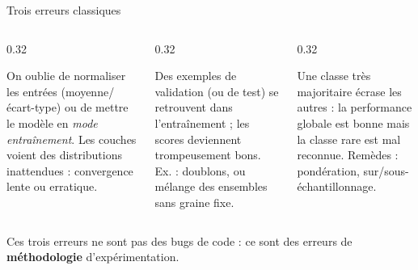 \begin{frame}{Trois erreurs classiques}
\begin{columns}[t]
\begin{column}{0.32\textwidth}
\begin{wbox}
On oublie de normaliser les entrées (moyenne/écart-type) ou de mettre le modèle
en \emph{mode entraînement}. Les couches voient des distributions inattendues :
convergence lente ou erratique.
\end{wbox}
\end{column}
\begin{column}{0.32\textwidth}
\begin{wbox}
Des exemples de validation (ou de test) se retrouvent dans l'entraînement ; les
scores deviennent trompeusement bons. Ex. : doublons, ou mélange des ensembles
sans graine fixe.
\end{wbox}
\end{column}
\begin{column}{0.32\textwidth}
\begin{wbox}
Une classe très majoritaire écrase les autres : la performance globale est
bonne mais la classe rare est mal reconnue. Remèdes : pondération, sur/sous-échantillonnage.
\end{wbox}
\end{column}
\end{columns}
\vspace{1mm}
\begin{kbox}
Ces trois erreurs ne sont pas des bugs de code : ce sont des erreurs de
\textbf{méthodologie} d'expérimentation.
\end{kbox}
\end{frame}

